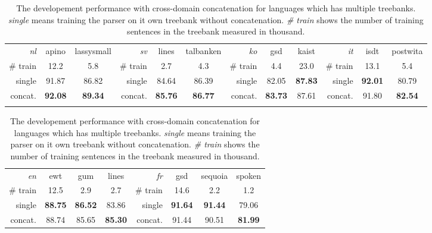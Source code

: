 \documentclass[11pt,a4paper]{article}
\begin{document}
\begin{table}[t]
	\centering
	\small
	\setlength{\tabcolsep}{5pt}
	\begin{tabular}{rcc || rcc || rcc || rcc}
		\textit{nl} & apino & lassysmall & \textit{sv} & lines & talbanken & \textit{ko} & gsd & kaist & \textit{it} & isdt & postwita \\
		\# train & 12.2 & 5.8 & \# train & 2.7 & 4.3 & \# train & 4.4 & 23.0 & \# train & 13.1 & 5.4 \\
		\hline
		single & 91.87 & 86.82 & single & 84.64 & 86.39 & single & 82.05 & \textbf{87.83} & single & \textbf{92.01} & 80.79 \\
		concat. & \textbf{92.08} & \textbf{89.34} & concat. & \textbf{85.76} & \textbf{86.77} & concat. & \textbf{83.73} & 87.61 & concat.& 91.80 & \textbf{82.54} \\
		\vspace*{0.5em}
	\end{tabular}
	\begin{tabular}{rccc || rccc}
		\textit{en} & ewt & gum & lines & \textit{fr} & gsd & sequoia & spoken \\
		\# train & 12.5 & 2.9 & 2.7 & \# train & 14.6 & 2.2 & 1.2\\
		\hline
		single & \textbf{88.75} & \textbf{86.52} & 83.86 & single &\textbf{91.64} & \textbf{91.44} & 79.06 \\
		concat. & 88.74 & 85.65 & \textbf{85.30} & concat. & 91.44 & 90.51 & \textbf{81.99} \\
	\end{tabular}
	\caption{The developement performance with cross-domain concatenation for languages which has multiple treebanks.
		\textit{single} means training the parser on it own treebank without concatenation.
		\textit{\# train} shows the number of training sentences in the treebank measured in thousand.}\label{tbl:confuse-mat}
\end{table}
\end{document}
